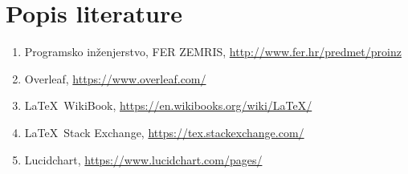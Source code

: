 \chapter*{Popis literature}
	 	
		
		\begin{enumerate}
			
			
			\item  Programsko inženjerstvo, FER ZEMRIS, \url{http://www.fer.hr/predmet/proinz}
			
			\item  Overleaf,
			\url{https://www.overleaf.com/}
			
			\item  \LaTeX\ WikiBook,
			\url{https://en.wikibooks.org/wiki/LaTeX/}
			
			\item  \LaTeX\ Stack Exchange,
			\url{https://tex.stackexchange.com/}
			
			\item  Lucidchart,
			\url{https://www.lucidchart.com/pages/}
			
		\end{enumerate}
		
		 